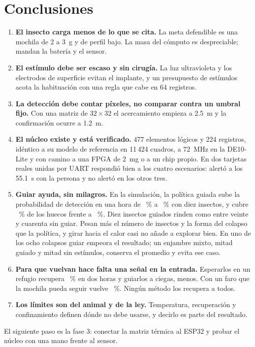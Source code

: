 \section{Conclusiones}

\begin{enumerate}
  \item \textbf{El insecto carga menos de lo que se cita.} La meta defendible es una mochila de 2 a 3~g y
        de perfil bajo. La masa del cómputo es despreciable; mandan la batería y el sensor.
  \item \textbf{El estímulo debe ser escaso y sin cirugía.} La luz ultravioleta y los electrodos de superficie
        evitan el implante, y un presupuesto de estímulos acota la habituación con una regla que cabe en
        64 registros.
  \item \textbf{La detección debe contar píxeles, no comparar contra un umbral fijo.} Con una matriz de
        $32\times32$ el acercamiento empieza a 2.5~m y la confirmación ocurre a 1.2~m.
  \item \textbf{El núcleo existe y está verificado.} 477 elementos lógicos y 224 registros, idéntico a su
        modelo de referencia en 11\,424 cuadros, a 72~MHz en la DE10-Lite y con camino a una FPGA de
        2~mg o a un chip propio. En dos tarjetas reales unidas por UART respondió bien a los cuatro
        escenarios: alertó a los 55.1~s con la persona y no alertó en los otros tres.
  \item \textbf{Guiar ayuda, sin milagros.} En la simulación, la política guiada sube la probabilidad de
        detección en una hora de \pPasivaSesenta~\% a \pGuiadaSesenta~\% con diez insectos, y cubre
        \cobGuiada~\% de los huecos frente a \cobPasiva~\%. Diez insectos guiados rinden como entre
        veinte y cuarenta sin guiar. Pesan más el número de insectos y la forma del colapso que la
        política, y girar hacia el calor casi no añade a explorar bien. En uno de los ocho colapsos
        guiar empeora el resultado; un enjambre mixto, mitad guiado y mitad sin estímulos, conserva
        el promedio y evita ese caso.
  \item \textbf{Para que vuelvan hace falta una señal en la entrada.} Esperarlos en un refugio recupera
        \regTrampaDos~\% en dos horas y guiarlos a ciegas, menos. Con un faro que la mochila pueda
        seguir vuelve \regFaroDos~\%. Ningún método los recupera a todos.
  \item \textbf{Los límites son del animal y de la ley.} Temperatura, recuperación y confinamiento definen
        dónde no debe usarse, y decirlo es parte del resultado.
\end{enumerate}

El siguiente paso es la fase 3: conectar la matriz térmica al ESP32 y probar el núcleo con una mano
frente al sensor.
